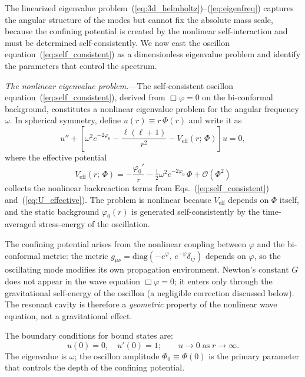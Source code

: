 \documentclass[aps,prd,onecolumn,superscriptaddress,nofootinbib,showpacs,12pt,notitlepage]{revtex4-2}
\renewcommand{\order}[1]{\mathcal{O}\!\left(#1\right)}
\begin{document}
The linearized eigenvalue
problem~(\ref{eq:3d_helmholtz})--(\ref{eq:eigenfreq})
captures the angular structure of the modes but cannot
fix the absolute mass scale, because the confining
potential is created by the nonlinear self-interaction
and must be determined self-consistently.  We now cast
the oscillon equation~(\ref{eq:self_consistent}) as a
dimensionless eigenvalue problem and identify the
parameters that control the spectrum.

\textit{The nonlinear eigenvalue problem.}---The
self-consistent oscillon
equation~(\ref{eq:self_consistent}), derived from
$\Box\varphi = 0$ on the bi-conformal background,
constitutes a nonlinear eigenvalue problem for the
angular frequency $\omega$.  In spherical symmetry,
define $u(r) \equiv r\,\Phi(r)$ and write it as
\begin{equation}\label{eq:mode_eq}
  u'' + \left[\omega^2 e^{-2\varphi_0}
    - \frac{\ell(\ell+1)}{r^2}
    - V_{\mathrm{eff}}(r;\,\Phi)\right]u = 0,
\end{equation}
where the effective potential
\begin{equation}\label{eq:Veff_explicit}
  V_{\mathrm{eff}}(r;\,\Phi) =
    -\frac{\varphi_0'}{r}
    - \tfrac{1}{2}\omega^2 e^{-2\varphi_0}\,\Phi
    + \order{\Phi^2}
\end{equation}
collects the nonlinear backreaction terms from
Eqs.~(\ref{eq:self_consistent})
and~(\ref{eq:U_effective}).  The problem is nonlinear
because $V_{\mathrm{eff}}$ depends on $\Phi$ itself,
and the static background $\varphi_0(r)$ is generated
self-consistently by the time-averaged stress-energy
of the oscillation.

The confining potential arises from the nonlinear coupling
between $\varphi$ and the bi-conformal metric: the metric
$g_{\mu\nu} = \mathrm{diag}(-e^{\varphi},\,
e^{-\varphi}\delta_{ij})$ depends on $\varphi$, so the
oscillating mode modifies its own propagation environment.
Newton's constant $G$ does not appear in the wave equation
$\Box\varphi = 0$; it enters only through the gravitational
self-energy of the oscillon (a negligible correction
discussed below).  The resonant cavity is therefore a
\emph{geometric} property of the nonlinear wave equation,
not a gravitational effect.

The boundary conditions for bound states are:
\begin{equation}\label{eq:bc_mass}
  u(0) = 0,\quad u'(0) = 1;\qquad
  u \to 0 \;\text{as}\; r \to \infty.
\end{equation}
The eigenvalue is $\omega$; the oscillon amplitude
$\Phi_0 \equiv \Phi(0)$ is the primary parameter that
controls the depth of the confining potential.
\end{document}
